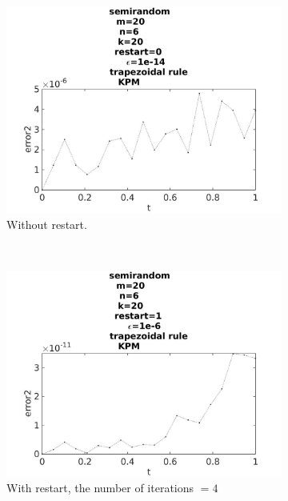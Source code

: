 \begin{figure}[H]
        \begin{subfigure}[b]{0.3\textwidth}
                \includegraphics[width=\textwidth]{../MATLAB/fig/errorarnrestart02.jpg}
                \caption{  Without restart. }
                \label{fig:errorarnrestart02}
        \end{subfigure}%
        ~
        \begin{subfigure}[b]{0.3\textwidth}
                \includegraphics[width=\textwidth]{../MATLAB/fig/errorarnrestart22.jpg}
                \caption{ With restart, the number of iterations $ = 4$ }
                \label{fig:errorarnrestart22}
        \end{subfigure}
        ~
        \begin{subfigure}[b]{0.3\textwidth}

\end{subfigure}
\end{figure}
